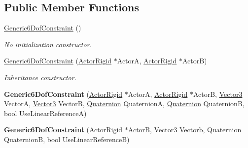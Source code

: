 \subsection*{Public Member Functions}
\begin{DoxyCompactItemize}
\item 
\hyperlink{classphys_1_1Generic6DofConstraint_ab897b1d7f04073cae60cf1d2615d04b4}{Generic6DofConstraint} ()
\begin{DoxyCompactList}\small\item\em No initialization constructor. \item\end{DoxyCompactList}\item 
\hyperlink{classphys_1_1Generic6DofConstraint_aae8cea56ac1d384d326a089e48842cbc}{Generic6DofConstraint} (\hyperlink{classphys_1_1ActorRigid}{ActorRigid} $\ast$ActorA, \hyperlink{classphys_1_1ActorRigid}{ActorRigid} $\ast$ActorB)
\begin{DoxyCompactList}\small\item\em Inheritance constructor. \item\end{DoxyCompactList}\item 
\hypertarget{classphys_1_1Generic6DofConstraint_abcd2ccd4e4366070f6879119fe2fb985}{
{\bfseries Generic6DofConstraint} (\hyperlink{classphys_1_1ActorRigid}{ActorRigid} $\ast$ActorA, \hyperlink{classphys_1_1ActorRigid}{ActorRigid} $\ast$ActorB, \hyperlink{classphys_1_1Vector3}{Vector3} VectorA, \hyperlink{classphys_1_1Vector3}{Vector3} VectorB, \hyperlink{classphys_1_1Quaternion}{Quaternion} QuaternionA, \hyperlink{classphys_1_1Quaternion}{Quaternion} QuaternionB, bool UseLinearReferenceA)}
\label{de/d2a/classphys_1_1Generic6DofConstraint_abcd2ccd4e4366070f6879119fe2fb985}

\item 
\hypertarget{classphys_1_1Generic6DofConstraint_a4b8b1dc473a133b51d516320a10b70d5}{
{\bfseries Generic6DofConstraint} (\hyperlink{classphys_1_1ActorRigid}{ActorRigid} $\ast$ActorB, \hyperlink{classphys_1_1Vector3}{Vector3} Vectorb, \hyperlink{classphys_1_1Quaternion}{Quaternion} QuaternionB, bool UseLinearReferenceB)}
\label{de/d2a/classphys_1_1Generic6DofConstraint_a4b8b1dc473a133b51d516320a10b70d5}


\end{DoxyCompactItemize}
